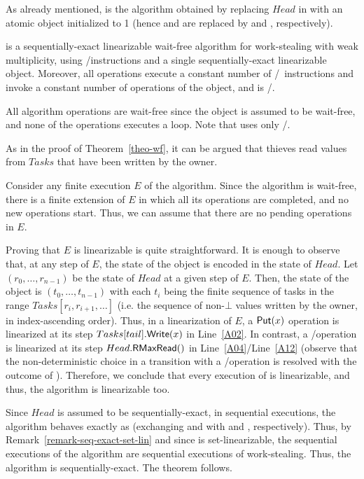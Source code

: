 As already mentioned, \NCWSM is the algorithm obtained by replacing \(Head\) in \WFWSM with an atomic \RangeMaxReg object initialized to 1 (hence \MaxR and \MaxW are replaced by \RMaxR and \RMaxW, respectively).


\begin{theorem}\label{theo-wf-nc}
  \NCWSM is a sequentially-exact linearizable wait-free algorithm for work-stealing with weak multiplicity, using \R/\W instructions and a single sequentially-exact linearizable \RangeMaxReg object. Moreover, all operations execute a constant number of \R/\W\ instructions and invoke a constant number of operations of the \RangeMaxReg object, and \Put is \R/\W.
\end{theorem}

\begin{thesisproof}

All algorithm operations are wait-free since the \RangeMaxReg object is assumed to be wait-free, and none of the operations executes a loop. Note that \Put uses only \R/\W.

As in the proof of Theorem~\ref{theo-wf}, it can be argued that thieves read values from \(Tasks\) that have been written by the owner.

Consider any finite execution \(E\) of the algorithm. Since the algorithm is wait-free, there is a finite extension of \(E\) in which all its operations are completed, and no new operations start. Thus, we can assume that there are no pending operations in \(E\).

Proving that \(E\) is linearizable is quite straightforward. It is enough to observe that, at any step of \(E\), the state of the object is encoded in the state of \(Head\). Let \((r_0, \hdots, r_{n-1})\) be the state of \(Head\) at a given step of \(E\). Then, the state of the object is \((t_0, \hdots, t_{n-1})\) with each \(t_i\) being the finite sequence of tasks in the range \(Tasks[r_i, r_{i+1}, \hdots]\) (i.e. the sequence of non-\(\bot\) values written by the owner, in index-ascending order).  Thus, in a linearization of \(E\), a \({\sf \small Put}(x)\) operation is linearized at its step \(Tasks[tail].{\sf \small Write}(x)\) in Line~\ref{A02}. In contrast, a \Take/\Steal operation is linearized at its step \(Head.{\sf \small RMaxRead}()\) in Line~\ref{A04}/Line~\ref{A12} (observe that the non-deterministic choice in a transition with a \Take/\Steal operation is resolved with the outcome of \RMaxR). Therefore, we conclude that every execution of \NCWSM is linearizable, and thus, the algorithm is linearizable too.

Since $Head$ is assumed to be sequentially-exact, in sequential executions, the algorithm behaves exactly as \WFWSM (exchanging \RMaxR and \RMaxW with \MaxR and \MaxW, respectively). Thus, by Remark~\ref{remark-seq-exact-set-lin} and since \WFWSM is set-linearizable, the sequential executions of the algorithm are sequential executions of work-stealing. Thus, the algorithm is sequentially-exact. The theorem follows.

\end{thesisproof}

